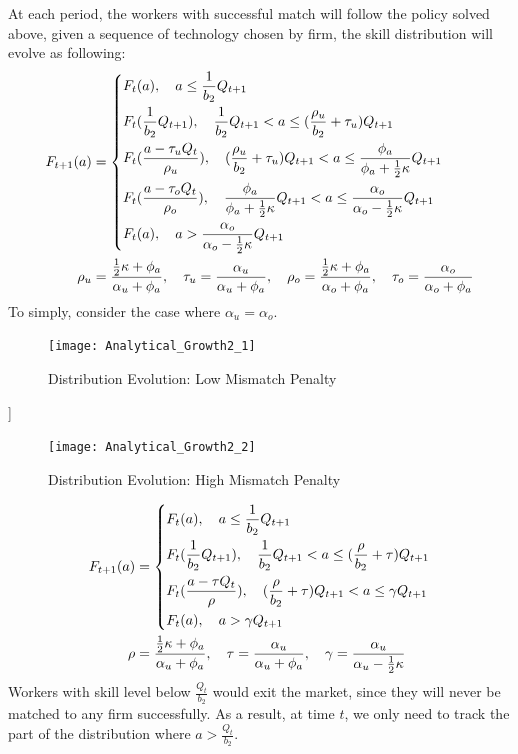 \documentclass{article}
\newcommand{\1}{\mathbb{1}}
\begin{document}
At each period, the workers with successful match will follow the policy solved above, given a sequence of technology chosen by firm, the skill distribution will evolve as following: 
\begin{align*}
F_{t+1}(a)
&= \begin{dcases}
F_t(a),\quad  a \leq \frac{1}{b_2}Q_{t+1} \\
F_t(\frac{1}{b_2}Q_{t+1}),\quad  \frac{1}{b_2}Q_{t+1}< a \leq (\frac{\rho_u}{b_2}+\tau_u)Q_{t+1} \\
F_t(\frac{a-\tau_uQ_t}{\rho_u}), \quad (\frac{\rho_u}{b_2}+\tau_u)Q_{t+1}< a \leq \frac{\phi_a}{\phi_a+\frac{1}{2}\kappa}Q_{t+1} \\
F_t(\frac{a-\tau_oQ_t}{\rho_o}),  \quad \frac{\phi_a}{\phi_a+\frac{1}{2}\kappa}Q_{t+1}<a \leq \frac{\alpha_o}{\alpha_o-\frac{1}{2}\kappa}Q_{t+1} \\
F_t(a), \quad a>\frac{\alpha_o}{\alpha_o-\frac{1}{2}\kappa}Q_{t+1} \\
\end{dcases} \\
\rho_u &= \frac{\frac{1}{2}\kappa+\phi_a}{\alpha_u+\phi_a}, \quad \tau_u = \frac{\alpha_u}{\alpha_u+\phi_a}, \quad
\rho_o = \frac{\frac{1}{2}\kappa+\phi_a}{\alpha_o+\phi_a}, \quad \tau_o = \frac{\alpha_o}{\alpha_o+\phi_a} 
\end{align*}
To simply, consider the case where $\alpha_u = \alpha_o$. 
\begin{figure}[h!]
\centering
\caption{Distribution Evolution: Low Mismatch Penalty}
\label{Analytical2_1}
\texttt{[image: Analytical\_Growth2\_1]}
\end{figure}]
\begin{figure}[h!]
\centering
\caption{Distribution Evolution: High Mismatch Penalty}
\label{Analytical2_2}
\texttt{[image: Analytical\_Growth2\_2]}
\end{figure}
\begin{align*}
F_{t+1}(a)
&= \begin{dcases}
F_t(a),\quad  a \leq \frac{1}{b_2}Q_{t+1} \\
F_t(\frac{1}{b_2}Q_{t+1}),\quad  \frac{1}{b_2}Q_{t+1}< a \leq (\frac{\rho}{b_2}+\tau)Q_{t+1} \\
F_t(\frac{a-\tau Q_t}{\rho}), \quad (\frac{\rho}{b_2}+\tau)Q_{t+1} < a \leq \gamma Q_{t+1} \\
F_t(a), \quad a>\gamma Q_{t+1} \\
\end{dcases} \\
\rho &= \frac{\frac{1}{2}\kappa+\phi_a}{\alpha_u+\phi_a}, \quad \tau = \frac{\alpha_u}{\alpha_u+\phi_a}, \quad \gamma = \frac{\alpha_u}{\alpha_u-\frac{1}{2}\kappa}
\end{align*}
Workers with skill level below $\frac{Q_t}{b_2}$ would exit the market, since they will never be matched to any firm successfully. As a result, at time $t$, we only need to track the part of the distribution where $a>\frac{Q_t}{b_2}$. \\
\end{document}
